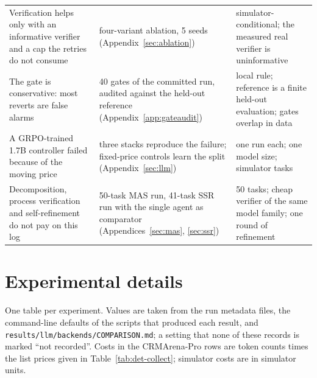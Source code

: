 \documentclass[10pt]{article}
\newcommand{\code}[1]{\texttt{#1}}
\begin{document}
\begin{table}[H]
\begin{tabular}{p{4.6cm}p{5.2cm}p{5.8cm}}
Verification helps only with an informative verifier and a cap the retries do not consume & four-variant ablation, 5 seeds (Appendix~\ref{sec:ablation}) & simulator-conditional; the measured real verifier is uninformative \\
The gate is conservative: most reverts are false alarms & 40 gates of the committed run, audited against the held-out reference (Appendix~\ref{app:gateaudit}) & local rule; reference is a finite held-out evaluation; gates overlap in data \\
A GRPO-trained 1.7B controller failed because of the moving price & three stacks reproduce the failure; fixed-price controls learn the split (Appendix~\ref{sec:llm}) & one run each; one model size; simulator tasks \\
Decomposition, process verification and self-refinement do not pay on this log & 50-task MAS run, 41-task SSR run with the single agent as comparator (Appendices~\ref{sec:mas}, \ref{sec:ssr}) & 50 tasks; cheap verifier of the same model family; one round of refinement \\
\bottomrule
\end{tabular}
\end{table}

\section{Experimental details}
\label{app:details}

One table per experiment. Values are taken from the run metadata files, the command-line defaults of the scripts that produced each result, and \code{results/llm/backends/COMPARISON.md}; a setting that none of these records is marked ``not recorded''. Costs in the CRMArena-Pro rows are token counts times the list prices given in Table~\ref{tab:det-collect}; simulator costs are in simulator units.
\end{document}

